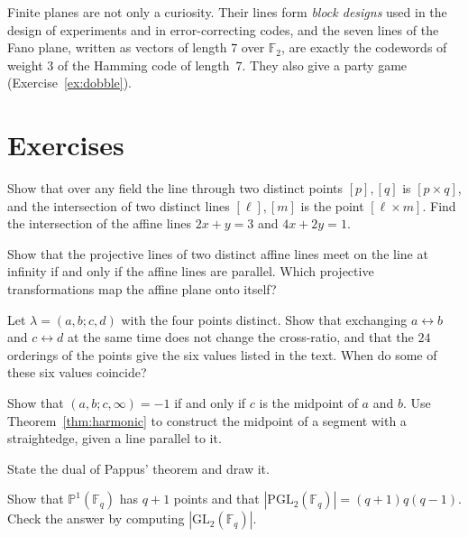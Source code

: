 Finite planes are not only a curiosity. Their lines form \emph{block designs} used in the design of experiments and in error-correcting codes,
and the seven lines of the Fano plane, written as vectors of length $7$ over $\mathbb F_2$, are exactly the codewords of weight $3$ of the
Hamming code of length~$7$. They also give a party game (Exercise~\ref{ex:dobble}).

\section{Exercises}

\begin{exercise}[$\star$]\label{ex:crossproduct}
Show that over any field the line through two distinct points $[p],[q]$ is $[p\times q]$, and the intersection of two distinct lines $[\ell],[m]$
is the point $[\ell\times m]$. Find the intersection of the affine lines $2x+y=3$ and $4x+2y=1$.
\end{exercise}

\begin{exercise}[$\star$]\label{ex:parallelinf}
Show that the projective lines of two distinct affine lines meet on the line at infinity if and only if the affine lines are parallel. Which
projective transformations map the affine plane onto itself?
\end{exercise}

\begin{exercise}[$\star$]\label{ex:sixvalues}
Let $\lambda=(a,b;c,d)$ with the four points distinct. Show that exchanging $a\leftrightarrow b$ and $c\leftrightarrow d$ at the same time
does not change the cross-ratio, and that the $24$ orderings of the points give the six values listed in the text. When do some of these six
values coincide?
\end{exercise}

\begin{exercise}[$\star$]\label{ex:harmonicmidpoint}
Show that $(a,b;c,\infty)=-1$ if and only if $c$ is the midpoint of $a$ and $b$. Use Theorem~\ref{thm:harmonic} to construct the midpoint of a
segment with a straightedge, given a line parallel to it.
\end{exercise}

\begin{exercise}[$\star$]\label{ex:dualpappus}
State the dual of Pappus' theorem and draw it.
\end{exercise}

\begin{exercise}[$\star$]\label{ex:projline}
Show that $\mathbb P^1(\mathbb F_q)$ has $q+1$ points and that $|\mathrm{PGL}_2(\mathbb F_q)|=(q+1)q(q-1)$. Check the answer by computing
$|\mathrm{GL}_2(\mathbb F_q)|$.
\end{exercise}

